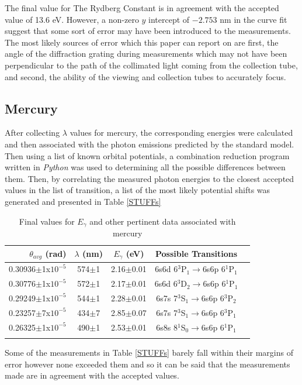 \documentclass[prb,preprint]{revtex4-1}
\begin{document}
\newpage

The final value for The Rydberg Constant is in agreement with the accepted value of 13.6 eV. However, a non-zero $y$ intercept of $-2.753$ nm in the curve fit suggest that some sort of error may have been introduced to the measurements. The most likely sources of error which this paper can report on are first, the angle of the diffraction grating during measurements which may not have been perpendicular to the path of the collimated light coming from the collection tube, and second, the ability of the viewing and collection tubes to accurately focus.

\subsection{Mercury}

After collecting $\lambda$ values for mercury, the corresponding energies were calculated and then associated with the photon emissions predicted by the standard model. Then using a list of known orbital potentials, a combination reduction program written in \textit{Python} was used to determining all the possible differences between them. Then, by correlating the measured photon energies to the closest accepted values in the list of transition, a list of the most likely potential shifts was generated and presented in Table \ref{STUFFs}

\begin{table}[h!]
\caption{Final values for $E_\gamma$ and other pertinent data associated with mercury}
\begin{ruledtabular}
\begin{tabular}{r c c c p{4 cm}}
$\theta_{avg}$ (rad)&$\lambda$ (nm)&$E_{\gamma}$ (eV)&Possible Transitions
\\
\hline
0.30936$\pm$1x$10^{-5}$&574$\pm$1&2.16$\pm$0.01& 6s6d 6$^3$P$_1\rightarrow$6s6p 6$^1$P$_1$\\
0.30776$\pm$1x$10^{-5}$&572$\pm$1&2.17$\pm$0.01& 6s6d 6$^3$D$_2\rightarrow$6s6p 6$^1$P$_1$\\
0.29249$\pm$1x$10^{-5}$&544$\pm$1&2.28$\pm$0.01& 6s7s 7$^3$S$_1\rightarrow$6s6p 6$^3$P$_2$\\
0.23257$\pm$7x$10^{-5}$&434$\pm$7&2.85$\pm$0.07& 6s7s 7$^3$S$_1\rightarrow$6s6p 6$^3$P$_1$\\
0.26325$\pm$1x$10^{-5}$&490$\pm$1&2.53$\pm$0.01& 6s8s 8$^1$S$_0\rightarrow$6s6p 6$^1$P$_1$\\
\label{STUFFs}
\end{tabular}
\end{ruledtabular}
\label{table I}
\end{table}
\newpage
Some of the measurements in Table \ref{STUFFs} barely fall within their margins of error however none exceeded them and so it can be said that the measurements made are in agreement with the accepted values.
\end{document}
